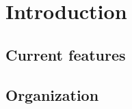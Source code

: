 \chapter{Introduction}
\label{chap:introduction}


	\section{Current features}
	\label{sec:features}
	

	\section{Organization}
	\label{sec:organization}
	